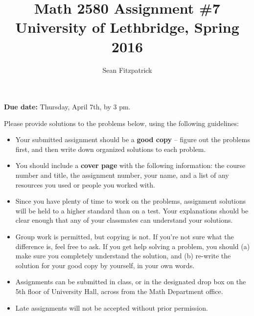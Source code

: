 \documentclass[letterpaper,12pt]{article}
\title{Math 2580 Assignment \#7\\University of Lethbridge, Spring 2016}
\author{Sean Fitzpatrick}
\begin{document}
 \maketitle

{\bf Due date:} Thursday, April 7th, by 3 pm.

\bigskip

Please provide solutions to the problems below, using the following guidelines:
\begin{itemize}
\item Your submitted assignment should be a {\bf good copy} -- figure out the problems first, and then write down organized solutions to each problem. 
\item You should include a {\bf cover page} with the following information: the course number and title, the assignment number, your name, and a list of any resources you used or people you worked with.
\item Since you have plenty of time to work on the problems, assignment solutions will be held to a higher standard than on a test. Your explanations should be clear enough that any of your classmates can understand your solutions.
\item Group work is permitted, but copying is not. If you're not sure what the difference is, feel free to ask. If you get help solving a problem, you should (a) make sure you completely understand the solution, and (b) re-write the solution for your good copy by yourself, in your own words.
\item Assignments can be submitted in class, or in the designated drop box on the 5th floor of University Hall, across from the Math Department office.
\item Late assignments will not be accepted without prior permission.

\end{itemize}
\newpage
\end{document}
